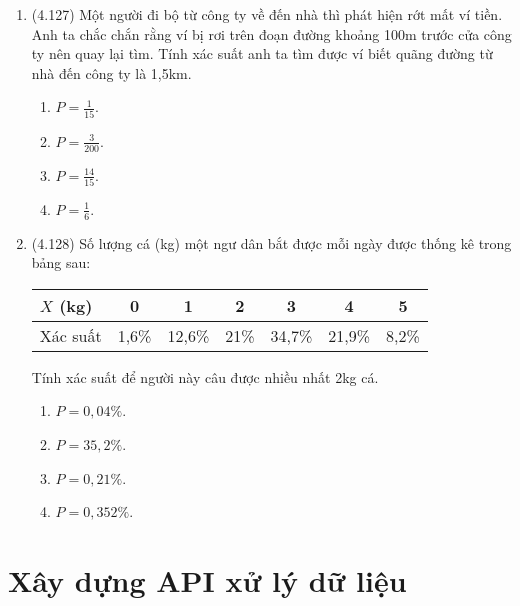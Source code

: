 \begin{enumerate}[label=\textbf{Câu \arabic*.},align=left,left=0cm..0cm,itemindent=*]
	\item (4.127) Một người đi bộ từ công ty về đến nhà thì phát hiện rớt mất ví tiền. Anh ta chắc chắn rằng ví bị rơi trên đoạn đường khoảng 100m trước cửa công ty nên quay lại tìm. Tính xác suất anh ta tìm được ví biết quãng đường từ nhà đến công ty là 1,5km.
	\begin{enumerate}[label=\textbf{\Alph*.},align=left,left=1cm..0cm,itemindent=*]
		\item $P=\frac 1{15}$. \item $P=\frac 3{200}$. \item $P=\frac {14}{15}$. \item $P=\frac 16$.
	\end{enumerate}
	\item (4.128) Số lượng cá (kg) một ngư dân bắt được mỗi ngày được thống kê trong bảng sau:
	\begin{longtable}{|l|c|c|c|c|c|c|}\hline
	$X$ (kg) & 0     & 1      & 2    & 3      & 4      & 5     \\ \hline
	Xác suất & 1,6\% & 12,6\% & 21\% & 34,7\% & 21,9\% & 8,2\% \\ \hline
	\end{longtable}
	Tính xác suất để người này câu được nhiều nhất 2kg cá.
	\begin{enumerate}[label=\textbf{\Alph*.},align=left,left=1cm..0cm,itemindent=*]
		\item $P=0,04\%$. \item $P=35,2\%$. \item $P=0,21\%$. \item $P=0,352\%$.
	\end{enumerate}
\end{enumerate}\par


\section{Xây dựng API xử lý dữ liệu}
